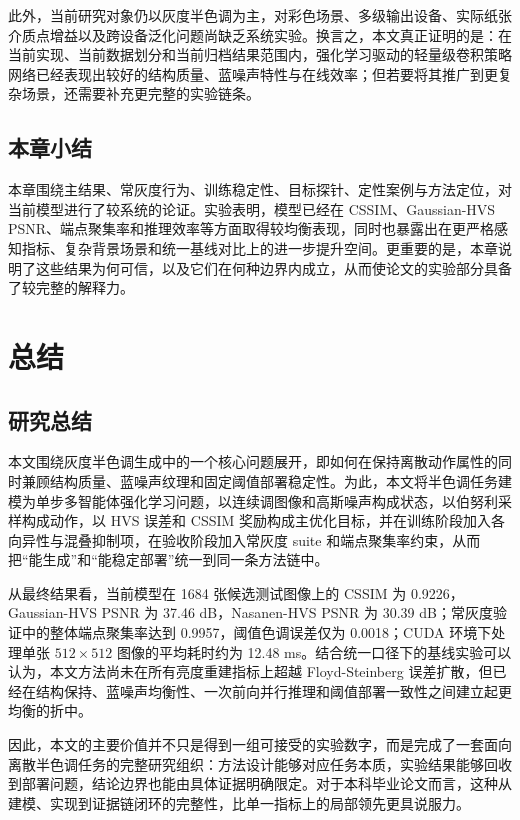 \documentclass[thesis]{../zstucs-graduation-project}
\begin{document}
此外，当前研究对象仍以灰度半色调为主，对彩色场景、多级输出设备、实际纸张介质点增益以及跨设备泛化问题尚缺乏系统实验。换言之，本文真正证明的是：在当前实现、当前数据划分和当前归档结果范围内，强化学习驱动的轻量级卷积策略网络已经表现出较好的结构质量、蓝噪声特性与在线效率；但若要将其推广到更复杂场景，还需要补充更完整的实验链条。

\subsection{本章小结}
本章围绕主结果、常灰度行为、训练稳定性、目标探针、定性案例与方法定位，对当前模型进行了较系统的论证。实验表明，模型已经在 CSSIM、Gaussian-HVS PSNR、端点聚集率和推理效率等方面取得较均衡表现，同时也暴露出在更严格感知指标、复杂背景场景和统一基线对比上的进一步提升空间。更重要的是，本章说明了这些结果为何可信，以及它们在何种边界内成立，从而使论文的实验部分具备了较完整的解释力。

\section{总结}

\subsection{研究总结}
本文围绕灰度半色调生成中的一个核心问题展开，即如何在保持离散动作属性的同时兼顾结构质量、蓝噪声纹理和固定阈值部署稳定性。为此，本文将半色调任务建模为单步多智能体强化学习问题，以连续调图像和高斯噪声构成状态，以伯努利采样构成动作，以 HVS 误差和 CSSIM 奖励构成主优化目标，并在训练阶段加入各向异性与混叠抑制项，在验收阶段加入常灰度 suite 和端点聚集率约束，从而把“能生成”和“能稳定部署”统一到同一条方法链中。

从最终结果看，当前模型在 1684 张候选测试图像上的 CSSIM 为 0.9226，Gaussian-HVS PSNR 为 37.46 dB，Nasanen-HVS PSNR 为 30.39 dB；常灰度验证中的整体端点聚集率达到 0.9957，阈值色调误差仅为 0.0018；CUDA 环境下处理单张 $512\times512$ 图像的平均耗时约为 12.48 ms。结合统一口径下的基线实验可以认为，本文方法尚未在所有亮度重建指标上超越 Floyd-Steinberg 误差扩散，但已经在结构保持、蓝噪声均衡性、一次前向并行推理和阈值部署一致性之间建立起更均衡的折中。

因此，本文的主要价值并不只是得到一组可接受的实验数字，而是完成了一套面向离散半色调任务的完整研究组织：方法设计能够对应任务本质，实验结果能够回收到部署问题，结论边界也能由具体证据明确限定。对于本科毕业论文而言，这种从建模、实现到证据链闭环的完整性，比单一指标上的局部领先更具说服力。
\end{document}
